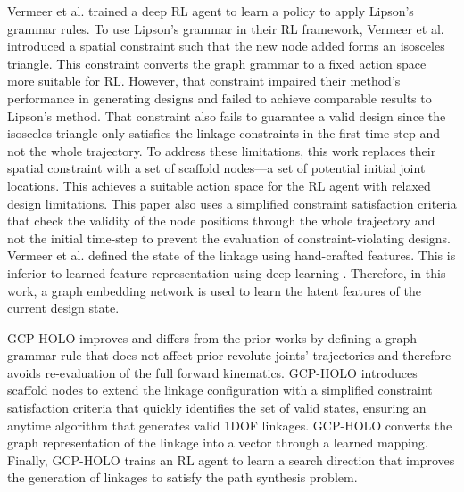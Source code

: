Vermeer et al. \cite{vermeer_kinematic_2018} trained a deep RL agent to learn a policy to apply Lipson’s grammar rules. To use Lipson’s grammar in their RL framework, Vermeer et al. introduced a spatial constraint such that the new node added forms an isosceles triangle. This constraint converts the graph grammar to a fixed action space more suitable for RL. However, that constraint impaired their method’s performance in generating designs and failed to achieve comparable results to Lipson’s method. That constraint also fails to guarantee a valid design since the isosceles triangle only satisfies the linkage constraints in the first time-step and not the whole trajectory. To address these limitations, this work replaces their spatial constraint with a set of scaffold nodes—a set of potential initial joint locations. This achieves a suitable action space for the RL agent with relaxed design limitations. This paper also uses a simplified constraint satisfaction criteria that check the validity of the node positions through the whole trajectory and not the initial time-step to prevent the evaluation of constraint-violating designs. Vermeer et al. defined the state of the linkage using hand-crafted features. This is inferior to learned feature representation using deep learning \cite{nanni_handcrafted_2017}. Therefore, in this work, a graph embedding network is used to learn the latent features of the current design state.

GCP-HOLO improves and differs from the prior works by defining a graph grammar rule that does not affect prior revolute joints’ trajectories and therefore avoids re-evaluation of the full forward kinematics. GCP-HOLO introduces scaffold nodes to extend the linkage configuration with a simplified constraint satisfaction criteria that quickly identifies the set of valid states, ensuring an anytime algorithm that generates valid 1DOF linkages. GCP-HOLO converts the graph representation of the linkage into a vector through a learned mapping. Finally, GCP-HOLO trains an RL agent to learn a search direction that improves the generation of linkages to satisfy the path synthesis problem.

